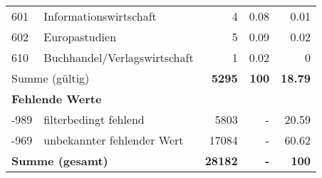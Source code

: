 \begin{longtable}{lXrrr}
        601 & \multicolumn{1}{X}{Informationswirtschaft} & %
          \num{4} &
          \num[round-mode=places,round-precision=2]{0.08} &
          \num[round-mode=places,round-precision=2]{0.01} \\

        602 & \multicolumn{1}{X}{Europastudien} & %
          \num{5} &
          \num[round-mode=places,round-precision=2]{0.09} &
          \num[round-mode=places,round-precision=2]{0.02} \\

        610 & \multicolumn{1}{X}{Buchhandel/Verlagswirtschaft} & %
          \num{1} &
          \num[round-mode=places,round-precision=2]{0.02} &
          \num[round-mode=places,round-precision=2]{0} \\

     \midrule
     \multicolumn{2}{l}{Summe (gültig)} &
       \textbf{\num{5295}} &
     \textbf{100} &
       \textbf{\num[round-mode=places,round-precision=2]{18.79}} \\
     \multicolumn{5}{l}{\textbf{Fehlende Werte}}\\
       -989 &
       filterbedingt fehlend &
         \num{5803} &
        - &
         \num[round-mode=places,round-precision=2]{20.59} \\
       -969 &
       unbekannter fehlender Wert &
         \num{17084} &
        - &
         \num[round-mode=places,round-precision=2]{60.62} \\
     \midrule
     \multicolumn{2}{l}{\textbf{Summe (gesamt)}} &
          \textbf{\num{28182}} &
        \textbf{-} &
        \textbf{100} \\
     \bottomrule
     \end{longtable}
     
